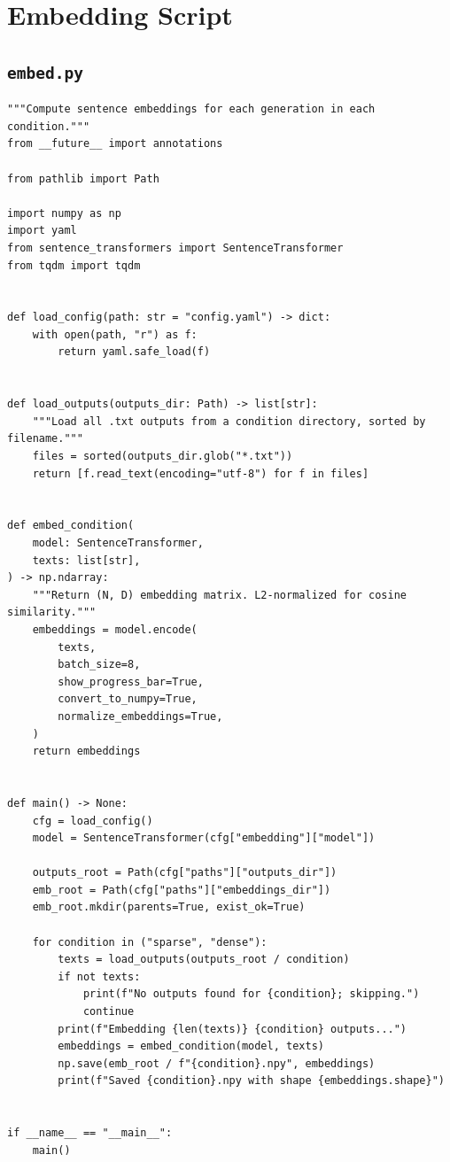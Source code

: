\documentclass[11pt]{article}
\begin{document}
\newpage

\section{Embedding Script}

\subsection{\texttt{embed.py}}

\begin{lstlisting}
"""Compute sentence embeddings for each generation in each condition."""
from __future__ import annotations

from pathlib import Path

import numpy as np
import yaml
from sentence_transformers import SentenceTransformer
from tqdm import tqdm


def load_config(path: str = "config.yaml") -> dict:
    with open(path, "r") as f:
        return yaml.safe_load(f)


def load_outputs(outputs_dir: Path) -> list[str]:
    """Load all .txt outputs from a condition directory, sorted by filename."""
    files = sorted(outputs_dir.glob("*.txt"))
    return [f.read_text(encoding="utf-8") for f in files]


def embed_condition(
    model: SentenceTransformer,
    texts: list[str],
) -> np.ndarray:
    """Return (N, D) embedding matrix. L2-normalized for cosine similarity."""
    embeddings = model.encode(
        texts,
        batch_size=8,
        show_progress_bar=True,
        convert_to_numpy=True,
        normalize_embeddings=True,
    )
    return embeddings


def main() -> None:
    cfg = load_config()
    model = SentenceTransformer(cfg["embedding"]["model"])

    outputs_root = Path(cfg["paths"]["outputs_dir"])
    emb_root = Path(cfg["paths"]["embeddings_dir"])
    emb_root.mkdir(parents=True, exist_ok=True)

    for condition in ("sparse", "dense"):
        texts = load_outputs(outputs_root / condition)
        if not texts:
            print(f"No outputs found for {condition}; skipping.")
            continue
        print(f"Embedding {len(texts)} {condition} outputs...")
        embeddings = embed_condition(model, texts)
        np.save(emb_root / f"{condition}.npy", embeddings)
        print(f"Saved {condition}.npy with shape {embeddings.shape}")


if __name__ == "__main__":
    main()
\end{lstlisting}
\end{document}
